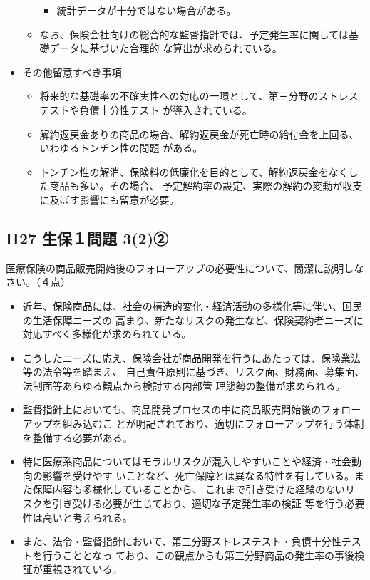 \documentclass[report,gutter=10mm,fore-edge=10mm,uplatex,dvipdfmx]{jlreq}
\begin{document}
\begin{itemize}
\begin{itemize}
\begin{itemize}
\begin{itemize}
\end{itemize}
 \item  統計データが十分ではない場合がある。
\end{itemize}
 \item  なお、保険会社向けの総合的な監督指針では、予定発生率に関しては基礎データに基づいた合理的
な算出が求められている。
\end{itemize}
 \item その他留意すべき事項
\begin{itemize} 
 \item 将来的な基礎率の不確実性への対応の一環として、第三分野のストレステストや負債十分性テスト が導入されている。
 \item  解約返戻金ありの商品の場合、解約返戻金が死亡時の給付金を上回る、いわゆるトンチン性の問題 がある。
 \item  トンチン性の解消、保険料の低廉化を目的として、解約返戻金をなくした商品も多い。その場合、
 予定解約率の設定、実際の解約の変動が収支に及ぼす影響にも留意が必要。
\end{itemize}
\end{itemize}

\subsection{H27 生保１問題 3(2)②}
医療保険の商品販売開始後のフォローアップの必要性について、簡潔に説明しなさい。（４点）

\begin{itemize}
 \item  近年、保険商品には、社会の構造的変化・経済活動の多様化等に伴い、国民の生活保障ニーズの
		     高まり、新たなリスクの発生など、保険契約者ニーズに対応すべく多様化が求められている。
 \item  こうしたニーズに応え、保険会社が商品開発を行うにあたっては、保険業法等の法令等を踏まえ、
  自己責任原則に基づき、リスク面、財務面、募集面、法制面等あらゆる観点から検討する内部管
  理態勢の整備が求められる。
\item 監督指針上においても、商品開発プロセスの中に商品販売開始後のフォローアップを組み込むこ
  とが明記されており、適切にフォローアップを行う体制を整備する必要がある。
\item 特に医療系商品についてはモラルリスクが混入しやすいことや経済・社会動向の影響を受けやす
  いことなど、死亡保障とは異なる特性を有している。また保障内容も多様化していることから、
  これまで引き受けた経験のないリスクを引き受ける必要が生じており、適切な予定発生率の検証
  等を行う必要性は高いと考えられる。
\item また、法令・監督指針において、第三分野ストレステスト・負債十分性テストを行うこととなっ
 ており、この観点からも第三分野商品の発生率の事後検証が重視されている。
\end{itemize}
\end{document}
